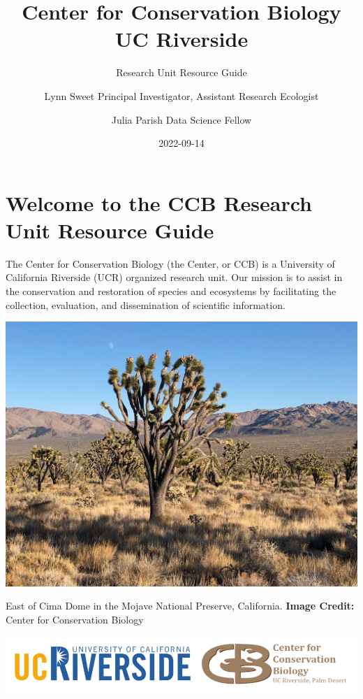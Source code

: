 \documentclass[
]{book}
\title{Center for Conservation Biology \textbar{} UC Riverside}
\subtitle{Research Unit Resource Guide}
\author{Lynn Sweet \textbar{} Principal Investigator, Assistant Research Ecologist \and Julia Parish \textbar{} Data Science Fellow}
\date{2022-09-14}
\begin{document}
\maketitle

{
\setcounter{tocdepth}{1}
\tableofcontents
}
\hypertarget{welcome-to-the-ccb-research-unit-resource-guide}{%
\chapter*{Welcome to the CCB Research Unit Resource Guide}\label{welcome-to-the-ccb-research-unit-resource-guide}}

The Center for Conservation Biology (the Center, or CCB) is a University of California Riverside (UCR) organized research unit. Our mission is to assist in the conservation and restoration of species and ecosystems by facilitating the collection, evaluation, and dissemination of scientific information.

\includegraphics{images/cima2019}

East of Cima Dome in the Mojave National Preserve, California.
\textbf{Image Credit:} Center for Conservation Biology

\begin{center}\includegraphics{images/ucrccb} \end{center}
\end{document}
